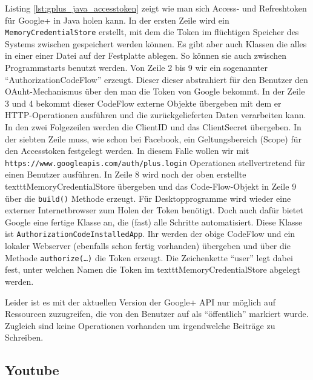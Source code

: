 Listing \ref{lst:gplus_java_accesstoken} zeigt wie man sich Access- und Refreshtoken für Google+ in Java holen kann. In der ersten Zeile wird ein \texttt{MemoryCredentialStore} erstellt, mit dem die Token im flüchtigen Speicher des Systems zwischen gespeichert werden können. Es gibt aber auch Klassen die alles in einer einer Datei auf der Festplatte ablegen. So können sie auch zwischen Programmstarts benutzt werden. Von Zeile 2 bis 9 wir ein sogenannter \enquote{AuthorizationCodeFlow} erzeugt. Dieser dieser abstrahiert für den Benutzer den OAuht-Mechanismus über den man die Token von Google bekommt. In der Zeile 3 und 4 bekommt dieser CodeFlow externe Objekte übergeben mit dem er HTTP-Operationen ausführen und die zurückgelieferten Daten verarbeiten kann. In den zwei Folgezeilen werden die ClientID und das ClientSecret übergeben. In der siebten Zeile muss, wie schon bei Facebook, ein Geltungsbereich (Scope) für den Accesstoken festgelegt werden. In diesem Falle wollen wir mit \texttt{https://www.googleapis.com/auth/plus.login} Operationen stellvertretend für einen Benutzer ausführen. In Zeile 8 wird noch der oben erstellte texttt{MemoryCredentialStore} übergeben und das Code-Flow-Objekt in Zeile 9 über die \texttt{build()} Methode erzeugt. Für Desktopprogramme wird wieder eine externer Internetbrowser zum Holen der Token benötigt. Doch auch dafür bietet Google eine fertige Klasse an, die (fast) alle Schritte automatisiert. Diese Klasse ist \texttt{AuthorizationCodeInstalledApp}. Ihr werden der obige CodeFlow und ein lokaler Webserver (ebenfalls schon fertig vorhanden) übergeben und über die Methode \texttt{authorize(\dots)} die Token erzeugt. Die Zeichenkette \enquote{user} legt dabei fest, unter welchen Namen die Token im texttt{MemoryCredentialStore} abgelegt werden.

Leider ist es mit der aktuellen Version der Google+ API nur möglich auf Ressourcen zuzugreifen, die von den Benutzer auf als \enquote{öffentlich} markiert wurde. Zugleich sind keine Operationen vorhanden um irgendwelche Beiträge zu Schreiben.



\subsection{Youtube} %
\label{sub:youtube_connector}

